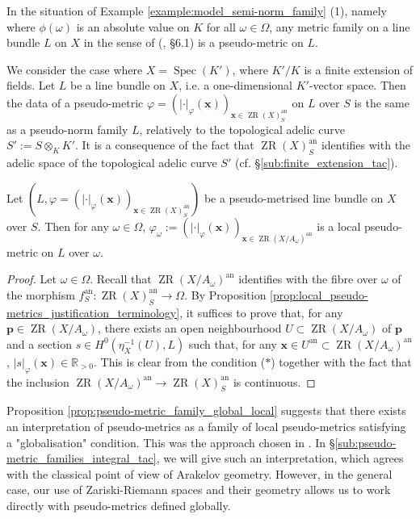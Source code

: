 \documentclass [11pt,reqno]{amsart}
\def\bR{{\mathbb{R}}}
\newcommand{\1}{\mathmybb{1}}
\def\an{\operatorname{an}}
\def\Spec{\operatorname{Spec}}
\def\ZR{\operatorname{ZR}}
\begin{document}
\begin{example}
\label{example:pseudo-metric_adelic_curve}
In the situation of Example \ref{example:model_semi-norm_family} (1), namely where $\phi(\omega)$ is an absolute value on $K$ for all $\omega\in\Omega$, any metric family on a line bundle $L$ on $X$ in the sense of (\cite{ChenMori}, \S 6.1) is a pseudo-metric on $L$. 
\end{example}

\begin{remark}
\label{rem:CM_6.1.3_general}
We consider the case where $X=\Spec(K')$, where $K'/K$ is a finite extension of fields. Let $L$ be a line bundle on $X$, i.e. a one-dimensional $K'$-vector space. Then the data of a pseudo-metric $\varphi=(|\cdot|_{\varphi}(\mathbf{x}))_{\mathbf{x}\in \ZR(X)^{\an}_{S}}$ on $L$ over $S$ is the same as a pseudo-norm family $L$, relatively to the topological adelic curve $S' := S \otimes_{K} K'$. It is a consequence of the fact that $\ZR(X)^{\an}_{S}$ identifies with the adelic space of the topological adelic curve $S'$ (cf. \S \ref{sub:finite_extension_tac}).
\end{remark}

\begin{proposition}
\label{prop:pseudo-metric_family_global_local}
Let $(L,\varphi=(|\cdot|_{\varphi}(\mathbf{x}))_{\mathbf{x}\in \ZR(X)^{\an}_{S}})$ be a pseudo-metrised line bundle on $X$ over $S$. Then for any $\omega\in \Omega$, $\varphi_{\omega}:=(|\cdot|_{\varphi}(\mathbf{x}))_{\mathbf{x}\in\ZR(X/A_{\omega})^{\an}}$ is a local pseudo-metric on $L$ over $\omega$.
\end{proposition}

\begin{proof}
Let $\omega\in\Omega$. Recall that $\ZR(X/A_{\omega})^{\an}$ identifies with the fibre over $\omega$ of the morphism $f^{\an}_{S}:\ZR(X)^{\an}_{S}\to\Omega$. By Proposition \ref{prop:local_pseudo-metrics_justification_terminology}, it suffices to prove that, for any $\mathbf{p}\in \ZR(X/A_{\omega})$, there exists an open neighbourhood $U\subset \ZR(X/A_{\omega})$ of $\mathbf{p}$ and a section $s\in H^{0}(\eta_{X}^{-1}(U),L)$ such that, for any $\mathbf{x}\in U^{\an} \subset \ZR(X/A_{\omega})^{\an}$, $|s|_{\varphi}(\mathbf{x})\in \bR_{>0}$. This is clear from the condition ($\ast$) together with the fact that the inclusion $\ZR(X/A_{\omega})^{\an} \to \ZR(X)^{\an}_{S}$ is continuous.
\end{proof}

\begin{remark}
\label{rem:pseudo-metric_family_local_global}
Proposition \ref{prop:pseudo-metric_family_global_local} suggests that there exists an interpretation of pseudo-metrics as a family of local pseudo-metrics satisfying a "globalisation" condition. This was the approach chosen in \cite{Sedillotthese}. In \S \ref{sub:pseudo-metric_families_integral_tac}, we will give such an interpretation, which agrees with the classical point of view of Arakelov geometry.
However, in the general case, our use of Zariski-Riemann spaces and their geometry allows us to work directly with pseudo-metrics defined globally.
\end{remark}
\end{document}
